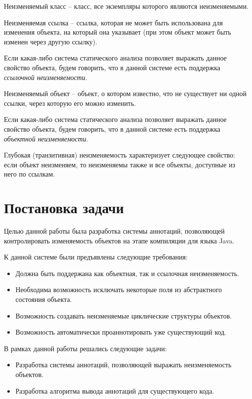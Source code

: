 \begin{Def}\label{immutabule_class}
Неизменяемый класс -- класс, все экземпляры которого являются неизменяемыми. 
\end{Def}

\begin{Def}\label{reference_immutability}
Неизменяемая ссылка -- ссылка, которая не может быть использована для изменения объекта, на который она указывает (при этом объект может быть изменен через другую ссылку).
\end{Def} 

Если какая-либо система статического анализа позволяет выражать данное свойство объекта, будем говорить, что в данной системе есть поддержка \textit{ссылочной неизменяемости}. 

\begin{Def}\label{immutable_object}
Неизменяемый объект -- объект, о котором известно, что не существует ни одной ссылки, через которую его можно изменить.
\end{Def}

Если какая-либо система статического анализа позволяет выражать данное свойство объекта, будем говорить, что в данной системе есть поддержка \textit{объектной неизменяемости}.

\begin{Def}\label{deep_immutablity}
Глубокая (транзитивная) неизменяемость характеризует следующее свойство: если объект неизменяем, то неизменяемы также и все объекты, доступные из него по ссылкам.
\end{Def}



\section{Постановка задачи}

Целью данной работы была разработка системы аннотаций, позволяющей контролировать изменяемость объектов на этапе компиляции для языка Java. 

К данной системе были предъявлены следующие требования:

\begin{itemize}
	\item Должна быть поддержана как объектная, так и ссылочная неизменяемость.
	
	\item Необходима возможность исключать некоторые поля из абстрактного состояния объекта. 
	
	\item Возможность создавать неизменяемые циклические структуры объектов.
	
	\item Возможность автоматически проаннотировать уже существующий код.
\end{itemize}

В рамках данной работы решались следующие задачи:

\begin{itemize}

	\item Разработка системы аннотаций, позволяющей выражать неизменяемость объектов.
	
	\item Разработка алгоритма вывода аннотаций для существующего кода.

\end{itemize}



